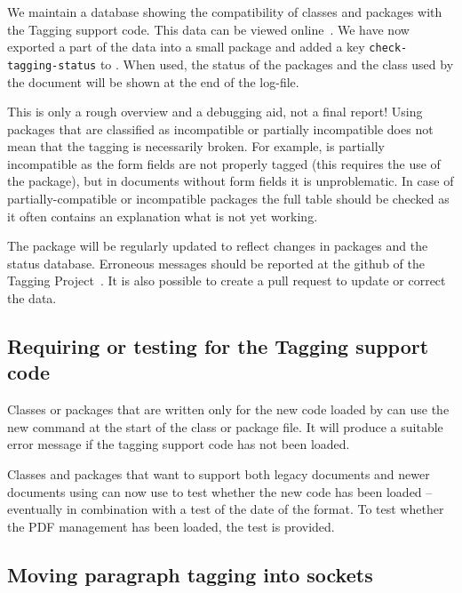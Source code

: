 \documentclass{ltnews}
\begin{document}
We maintain a database showing the compatibility of classes and
packages with the Tagging support code. This data can be viewed
online~\cite{tagging-status}.  We have now exported a part of the data
into a small package  and added a key
\texttt{check-tagging-status} to .  When used, the
status of the packages and the class used by the document will be
shown at the end of the log-file.

This is only a rough overview and a debugging aid, not a final report!
Using packages that are classified as incompatible or partially
incompatible does not mean that the tagging is necessarily broken. For
example,  is partially incompatible as the form fields
are not properly tagged (this requires the use of the 
package), but in documents without form fields it is unproblematic.
In case of partially-compatible or incompatible packages the full
table should be checked as it often contains an explanation what is
not yet working.
    
The package  will be regularly updated to
reflect changes in packages and the status database. Erroneous
messages should be reported at the github of the Tagging
Project~\cite{tagging-project}. It is also possible to create a pull
request to update or correct the data.


\subsection{Requiring or testing for the Tagging support code}

Classes or packages that are written only for the new code loaded by
 can use the new command
 at the start of the class or package
file. It will produce a suitable error message if the tagging support
code has not been loaded.

Classes and packages that want to support both legacy documents and
newer documents using  can now use
 to test whether the new code has been loaded
-- eventually in combination with a test of the date of the format. To
test whether the PDF management has been loaded, the test
 is provided.

 
\subsection{Moving paragraph tagging into sockets}
\end{document}

